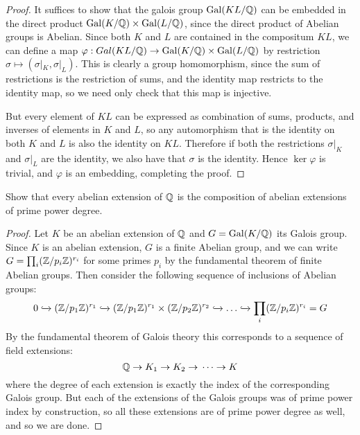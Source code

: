 \documentclass[11pt]{article}
\DeclareMathOperator{\Gal}{Gal}
\begin{document}
\begin{proof}
  It suffices to show that the galois group $\Gal(KL/\Q)$ can be embedded in the direct product $\Gal(K/\Q) \times \Gal(L/\Q)$, since the direct product of Abelian groups is Abelian.
  Since both $K$ and $L$ are contained in the compositum $KL$, we can define a map $\varphi : Gal(KL/\Q) \rightarrow \Gal(K/\Q) \times \Gal(L/\Q)$ by restriction $\sigma \mapsto (\sigma|_K, \sigma|_L)$.
  This is clearly a group homomorphism, since the sum of restrictions is the restriction of sums, and the identity map restricts to the identity map, so we need only check that this map is injective.

  But every element of $KL$ can be expressed as combination of sums, products, and inverses of elements in $K$ and $L$, so any automorphism that is the identity on both $K$ and $L$ is also the identity on $KL$.
  Therefore if both the restrictions $\sigma|_K$ and $\sigma|_L$ are the identity, we also have that $\sigma$ is the identity.
  Hence $\ker \varphi$ is trivial, and $\varphi$ is an embedding, completing the proof.
\end{proof}


Show that every abelian extension of $\mathbb{Q}$ is the composition of abelian extensions of prime power degree.

\begin{proof}
  Let $K$ be an abelian extension of $\mathbb{Q}$ and $G = \Gal(K/\Q)$ its Galois group.
  Since $K$ is an abelian extension, $G$ is a finite Abelian group, and we can write $G = \prod_i (\mathbb{Z}/p_i\mathbb{Z})^{r_i}$ for some primes $p_i$ by the fundamental theorem of finite Abelian groups.
  Then consider the following sequence of inclusions of Abelian groups:
  \begin{equation*}
    0 \xhookrightarrow{} (\mathbb{Z}/p_1\mathbb{Z})^{r_1}
    \xhookrightarrow{} (\mathbb{Z}/p_1\mathbb{Z})^{r_1} \times (\mathbb{Z}/p_2\mathbb{Z})^{r_2}
    \xhookrightarrow{} \dots \xhookrightarrow{}
    \prod_i (\mathbb{Z}/p_i\mathbb{Z})^{r_i} = G    
  \end{equation*}
  By the fundamental theorem of Galois theory this corresponds to a sequence of field extensions:
  \begin{equation*}
    \mathbb{Q} \rightarrow{} K_1 \rightarrow{} K_2 \rightarrow{} \dots
    \rightarrow{} K
  \end{equation*}
  where the degree of each extension is exactly the index of the corresponding Galois group.
  But each of the extensions of the Galois groups was of prime power index by construction, so all these extensions are of prime power degree as well, and so we are done.
\end{proof} 
\end{document}
